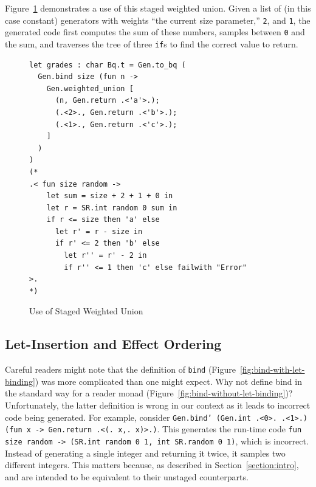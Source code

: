 \documentclass[acmsmall]{acmart}
\theoremstyle{definition}
\begin{document}
Figure~\ref{fig:staged-weighted-union-example} demonstrates a use of this staged weighted union.
Given a list of (in this case constant) generators with weights ``the current size parameter,'' \texttt{2}, and \texttt{1},
the generated code first computes the sum of these numbers, samples between \texttt{0} and the sum, and
traverses the tree of three \texttt{if}s to find the correct value to return.

\begin{figure}[h]
\begin{lstlisting}
let grades : char Bq.t = Gen.to_bq (
  Gen.bind size (fun n ->
    Gen.weighted_union [
      (n, Gen.return .<'a'>.);
      (.<2>., Gen.return .<'b'>.);
      (.<1>., Gen.return .<'c'>.);
    ]
  )
)
(*
.< fun size random ->
    let sum = size + 2 + 1 + 0 in
    let r = SR.int random 0 sum in
    if r <= size then 'a' else
      let r' = r - size in
      if r' <= 2 then 'b' else
        let r'' = r' - 2 in
        if r'' <= 1 then 'c' else failwith "Error"
>.
*)
\end{lstlisting}
\caption{Use of Staged Weighted Union}
\label{fig:staged-weighted-union-example}
\end{figure}

\subsection{Let-Insertion and Effect Ordering}
Careful readers might note that the definition of \texttt{bind} (Figure~\ref{fig:bind-with-let-binding})
was more complicated than one might expect. Why not define bind in the standard way
for a reader monad (Figure~\ref{fig:bind-without-let-binding})?
Unfortunately, the latter definition is wrong in our context as it leads to incorrect code being generated.
For example, consider \texttt{Gen.bind' (Gen.int .<0>. .<1>.) (fun x -> Gen.return .<(.~x,.~x)>.)}.
This generates the run-time code \texttt{fun size random -> (SR.int random 0 1, int SR.random 0 1)},
which is incorrect.  Instead of generating a single integer and returning it
twice, it samples two different integers.
This matters because, as described in Section~\ref{section:intro}, \camlname and
\scalaname are intended to be equivalent to their unstaged counterparts.
\end{document}
